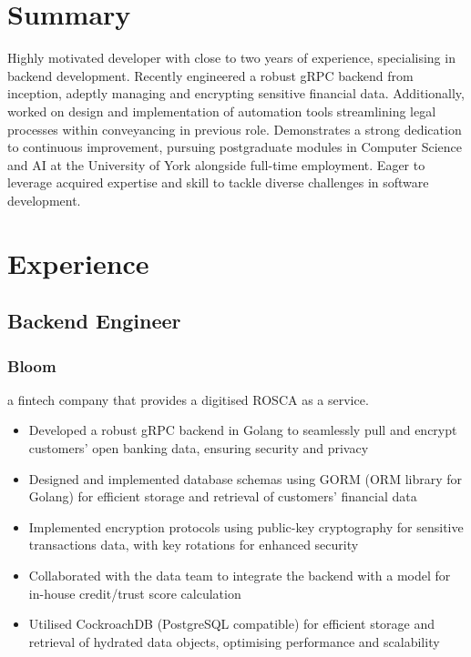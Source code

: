\documentclass{article}
\begin{document}
\begin{paracol}{2}
  \raggedright
  \vspace{3pt}
  \section{Summary}
  Highly motivated developer with close to two years of experience, specialising in backend development. Recently engineered a robust gRPC backend from inception, adeptly managing and encrypting sensitive financial data. Additionally, worked on design and implementation of automation tools streamlining legal processes within conveyancing in previous role. Demonstrates a strong dedication to continuous improvement, pursuing postgraduate modules in Computer Science and AI at the University of York alongside full-time employment. Eager to leverage acquired expertise and skill to tackle diverse challenges in software development.
  \section{Experience}
  \subsection{Backend Engineer}
  \subsubsection{Bloom}
  {\color{LightGrey}\scriptsize\href{https://www.bloommoney.co}{\faExternalLink}}
  \hspace*{\fill}{\color{TitleGrey}{\scriptsize\faCalendar}\hspace{5pt}{\small09/2023 -- Present}}
  
  {\noindent\small a fintech company that provides a digitised ROSCA as a service.}
  \begin{itemize}[leftmargin=*]
    \setlength\itemsep{-2pt}
    \item Developed a robust gRPC backend in Golang to seamlessly pull and encrypt customers' open banking data, ensuring security and privacy
    \item Designed and implemented database schemas using GORM (ORM library for Golang) for efficient storage and retrieval of customers' financial data
    \item Implemented encryption protocols using public-key cryptography for sensitive transactions data, with key rotations for enhanced security
    \item Collaborated with the data team to integrate the backend with a model for in-house credit/trust score calculation
    \item Utilised CockroachDB (PostgreSQL compatible) for efficient storage and retrieval of hydrated data objects, optimising performance and scalability
  \end{itemize}


\end{paracol}
\end{document}
